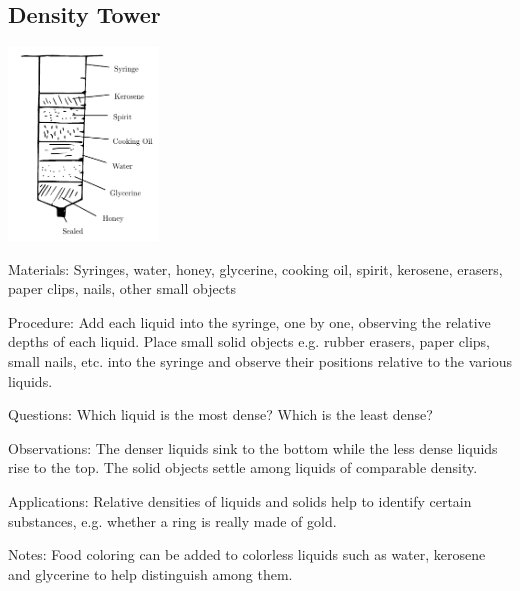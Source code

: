 \begin{multicols}{2}

\subsection{Density Tower}
\label{sub:density-column}

\begin{center}
\includegraphics[width=0.3\textwidth]{./img/density-tower.png}
\end{center}

\begin{description*}
\item[Materials:]{Syringes, water, honey, glycerine, cooking oil, spirit, kerosene, erasers, paper clips, nails, other small objects}
\item[Procedure:]{Add each liquid into the syringe, one by one, observing the relative depths of each liquid. Place small solid objects e.g. rubber erasers, paper clips, small nails, etc. into the syringe and observe their positions relative to the various liquids.}
\item[Questions:]{Which liquid is the most dense? Which is the least dense?}
\item[Observations:]{The denser liquids sink to the bottom while the less dense liquids rise to the top. The solid objects settle among liquids of comparable density.}
\item[Applications:]{Relative densities of liquids and solids help to identify certain substances, e.g. whether a ring is really made of gold.}
\item[Notes:]{Food coloring can be added to colorless liquids such as water, kerosene and glycerine to help distinguish among them.}
\end{description*}


\end{multicols}
